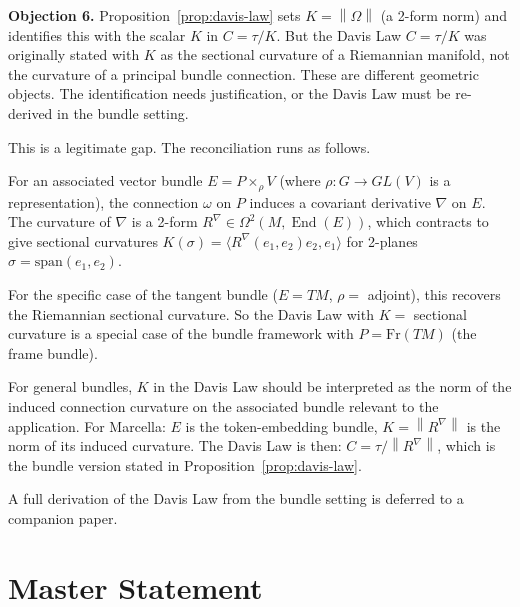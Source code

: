 \documentclass[12pt]{amsart}
\theoremstyle{plain}
\theoremstyle{definition}
\DeclareMathOperator{\End}{End}
\newcommand{\norm}[1]{\left\lVert #1 \right\rVert}
\begin{document}
\begin{auditbox}
\textbf{Objection 6.} Proposition~\ref{prop:davis-law} sets $K =
\norm{\Omega}$ (a 2-form norm) and identifies this with the scalar $K$ in
$C = \tau/K$. But the Davis Law $C = \tau/K$ was originally stated with $K$
as the sectional curvature of a Riemannian manifold, not the curvature of a
principal bundle connection. These are different geometric objects. The
identification needs justification, or the Davis Law must be re-derived in
the bundle setting.
\end{auditbox}

\begin{replybox}
This is a legitimate gap. The reconciliation runs as follows.

For an associated vector bundle $E = P \times_\rho V$ (where $\rho: G \to
GL(V)$ is a representation), the connection $\omega$ on $P$ induces a
covariant derivative $\nabla$ on $E$. The curvature of $\nabla$ is a
2-form $R^\nabla \in \Omega^2(M, \End(E))$, which contracts to give
sectional curvatures $K(\sigma) = \langle R^\nabla(e_1,e_2)e_2, e_1\rangle$
for 2-planes $\sigma = \mathrm{span}(e_1,e_2)$.

For the specific case of the tangent bundle ($E = TM$, $\rho = $ adjoint),
this recovers the Riemannian sectional curvature. So the Davis Law with $K =
$ sectional curvature is a special case of the bundle framework with $P =
\mathrm{Fr}(TM)$ (the frame bundle).

For general bundles, $K$ in the Davis Law should be interpreted as the norm
of the induced connection curvature on the associated bundle relevant to the
application. For Marcella: $E$ is the token-embedding bundle, $K =
\norm{R^\nabla}$ is the norm of its induced curvature. The Davis Law is then:
$C = \tau / \norm{R^\nabla}$, which is the bundle version stated in
Proposition~\ref{prop:davis-law}.

A full derivation of the Davis Law from the bundle setting is deferred to a
companion paper.
\end{replybox}

\section{Master Statement}
\label{sec:master}
\end{document}
